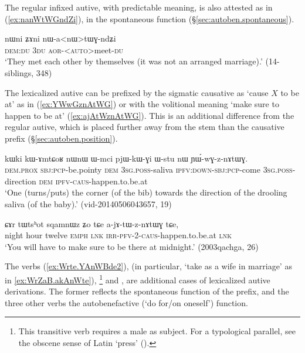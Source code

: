 The regular infixed autive, with predictable meaning, is also attested as in  (\ref{ex:nanWtWGndZi}), in the spontaneous function (§\ref{sec:autoben.spontaneous}).

\begin{exe}
\ex \label{ex:nanWtWGndZi}
\gll nɯni ʑɤni nɯ-a<nɯ>tɯɣ-ndʑi \\
\textsc{dem}:\textsc{du} \textsc{3du}
\textsc{aor}-<\textsc{auto}>meet-\textsc{du} \\
\glt `They met each other by themselves (it was not an arranged marriage).' (14-siblings, 348)
\end{exe}

The lexicalized autive  can be prefixed by the sigmatic causative as  `cause $X$ to be at' as in (\ref{ex:YWwGznAtWG}) or with the volitional meaning `make sure to happen to be at' (\ref{ex:ajAtWznAtWG}). This is an additional difference from the regular autive, which is placed further away from the stem than the causative prefix (§\ref{sec:autoben.position}).

\begin{exe}
\ex \label{ex:YWwGznAtWG}
\gll kɯki kɯ-ɤmtɕoʁ nɯnɯ ɯ-mci pjɯ-kɯ-ɣi ɯ-stu nɯ ɲɯ́-wɣ-z-nɤtɯɣ. \\
\textsc{dem}.\textsc{prox} \textsc{sbj}:\textsc{pcp}-be.pointy \textsc{dem} \textsc{3sg}.\textsc{poss}-saliva \textsc{ipfv}:\textsc{down}-\textsc{sbj}:\textsc{pcp}-come \textsc{3sg}.\textsc{poss}-direction \textsc{dem} \textsc{ipfv}-\textsc{caus}-happen.to.be.at \\
\glt `One (turns/puts) the corner (of the bib) towards the direction of the drooling saliva (of the baby).' (vid-20140506043657, 19)
\end{exe}

\begin{exe}
\ex \label{ex:ajAtWznAtWG}
\gll ɕɤr tɯtsʰot sqamnɯz ʑo tɕe a-jɤ-tɯ-z-nɤtɯɣ tɕe, \\
 night hour twelve \textsc{emph} \textsc{lnk}  \textsc{irr}-\textsc{pfv}-2-\textsc{caus}-happen.to.be.at \textsc{lnk} \\
\glt `You will have to make sure to be there at midnight.' (2003qachga, 26)
\end{exe}
 

The verbs  (\ref{ex:Wrte.YAnWBde2}),  (in particular, `take as a wife in marriage' as in \ref{ex:WrZaB.akAnWte}), \footnote{This transitive verb requires a male as subject. For a typological parallel, see the obscene sense of Latin  `press' (\citealt[182]{adams90latin}). } and , are additional cases of lexicalized autive derivations. The former  reflects the spontaneous function of the  prefix, and the three other verbs the autobenefactive (`do for/on oneself') function.
  
